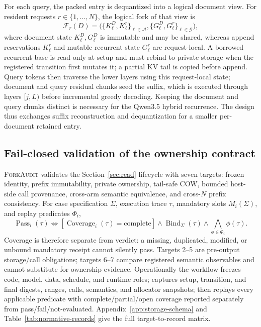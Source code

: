 \documentclass{article}
\newcommand{\method}{\textsc{ForkAudit}}
\begin{document}
For each query, the packed entry is dequantized into a logical document view.
For resident requests \(r\in\{1,\ldots,N\}\), the logical fork of that view is
\begin{equation}
  \mathcal{F}_r(D)=
  \bigl(\{K^D_\ell,K^r_\ell\}_{\ell\in\mathcal A},
        \{G^D_\ell,G^r_\ell\}_{\ell\in\mathcal G}\bigr),
\end{equation}
where document state \(K^D_\ell,G^D_\ell\) is immutable and may be shared,
whereas append reservations \(K^r_\ell\) and mutable recurrent state
\(G^r_\ell\) are request-local.  A borrowed recurrent base is read-only at
setup and must rebind to private storage when the registered transition first
mutates it; a partial KV tail is copied before append.  Query tokens then
traverse the lower layers using this request-local state; document and query
residual chunks seed the suffix, which is executed through layers $[j,L)$ before
incremental greedy decoding.  Keeping the document and query chunks distinct is
necessary for the Qwen3.5 hybrid recurrence.  The design thus exchanges suffix
reconstruction and dequantization for a smaller per-document retained entry.

\subsection{Fail-closed validation of the ownership contract}
\label{sec:contract}

\method{} validates the Section~\ref{sec:read} lifecycle with seven targets:
frozen identity, prefix immutability, private ownership, tail-safe COW, bounded
host-side call provenance, cross-arm semantic equivalence, and cross-\(N\)
prefix consistency.  For case specification \(\Sigma\), execution trace
\(\tau\), mandatory slots \(M_i(\Sigma)\), and replay predicates \(\Phi_i\),
\begin{equation}
  \operatorname{Pass}_i(\tau)\Longleftrightarrow
  [\operatorname{Coverage}_i(\tau)=\mathrm{complete}]
  \wedge\operatorname{Bind}_{\Sigma}(\tau)
  \wedge\bigwedge_{\phi\in\Phi_i}\phi(\tau).
\end{equation}
Coverage is therefore separate from verdict: a missing, duplicated, modified,
or unbound mandatory receipt cannot silently pass.  Targets 2--5 are
pre-output storage/call obligations; targets 6--7 compare registered semantic
observables and cannot substitute for ownership evidence.  Operationally the
workflow freezes code, model, data, schedule, and runtime roles; captures setup,
transition, and final digests, ranges, calls, semantics, and allocator
snapshots; then replays every applicable predicate with complete/partial/open
coverage reported separately from pass/fail/not-evaluated.
Appendix~\ref{app:storage-schema} and Table~\ref{tab:normative-records} give the
full target-to-record matrix.
\end{document}

